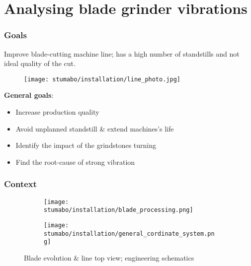 \section{Analysing blade grinder vibrations}
\SectionPage

\begin{frame}
    \frametitle{Goals}
    \vspace*{\fill}
    Improve blade-cutting machine line; has a high number of standstills and not ideal quality of the cut.
    \begin{figure}[ht]
        \texttt{[image: stumabo/installation/line\_photo.jpg]}
    \end{figure}
    \textbf{General goals}:
    \begin{itemize}
        \item Increase production quality
        \item Avoid unplanned standstill \& extend machines's life
        \item Identify the impact of the grindstones turning
        \item Find the root-cause of strong vibration
    \end{itemize}

    \vspace*{\fill}
\end{frame}

\begin{frame}
    \frametitle{Context}
    \begin{figure}[ht]
        \begin{subfigure}{\textwidth}
            \centering
            \texttt{[image: stumabo/installation/blade\_processing.png]}
        \end{subfigure}
        \begin{subfigure}{\textwidth}
            \centering
            \texttt{[image: stumabo/installation/general\_cordinate\_system.png]}
        \end{subfigure}
        \caption{Blade evolution \& line top view; engineering schematics}
    \end{figure}
\end{frame}

